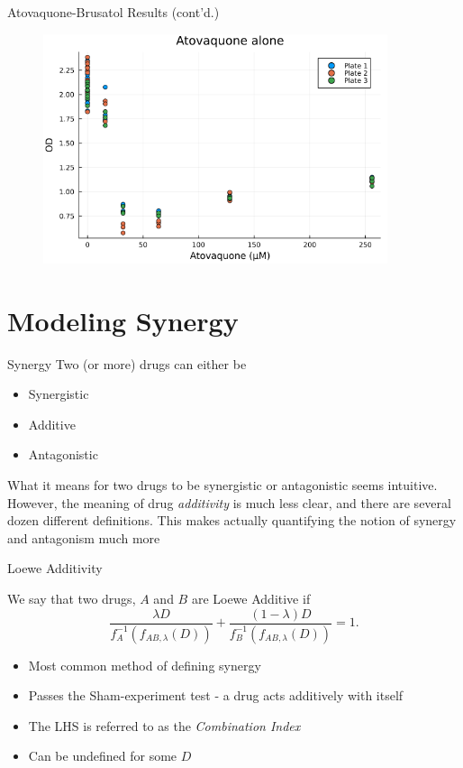 \documentclass{beamer}
\begin{document}
\begin{frame}{Atovaquone-Brusatol Results (cont'd.)}
    \begin{figure}[b]
        \includegraphics[width=0.9\textwidth]{figs/constant_rate_xto0.0.png}
    \end{figure}
\end{frame}


\section{Modeling Synergy}

\begin{frame}{Synergy}
    Two (or more) drugs can either be \begin{itemize}
        \item Synergistic 
        \item Additive
        \item Antagonistic
    \end{itemize}
   
    What it means for two drugs to be synergistic or antagonistic seems intuitive.
    However, the meaning of drug \textit{additivity} is much less clear, and there are several dozen different definitions.
    This makes actually quantifying the notion of synergy and antagonism much more

\end{frame}

\begin{frame}{Loewe Additivity}
    \begin{definition}
        We say that two drugs, $A$ and $B$ are \alert{Loewe Additive} if \[
            \frac{\lambda D}{f_A^{-1} (f_{AB, \lambda}(D))} + \frac{(1 - \lambda) D}{f_B^{-1} (f_{AB, \lambda}(D))} = 1.
        \]
    \end{definition}
    \vfill 
    \begin{itemize}
        \item Most common method of defining synergy
        \item Passes the \alert{Sham-experiment test} - a drug acts additively with itself
        \item The LHS is referred to as the \textit{Combination Index}
        \item Can be undefined for some $D$
    \end{itemize}
\end{frame}
\end{document}

